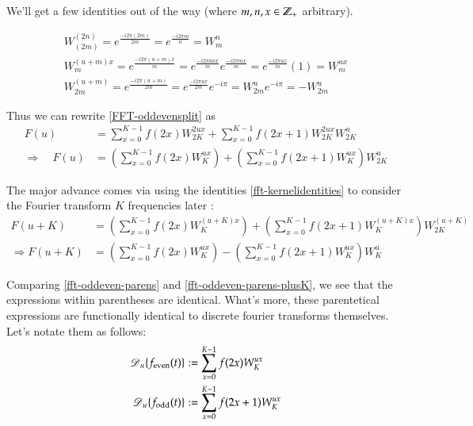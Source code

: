 We'll get a few identities out of the way (where $m, n, x \in \mathbb{Z}_{+}$ arbitrary).

\begin{gather} \label{fft-kernelidentities}
W_{(2m)}^{(2n)} = e^{\frac{-i2\pi(2m)}{2m}} = e^{\frac{-i2\pi m}{n}} = W_{m}^{n} \\
W_{m}^{(u+m)x} = e^{\frac{-i2\pi(u+m)x}{m} } = e^{\frac{-i2\pi unx}{m}} e^{\frac{-i2\pi mx}{m}}
			= e^{\frac{-i2\pi ux }{m}} (1) = W_m^{ux} \\
W_{2m}^{(u+m)} = e^{\frac{-i2\pi(u+m)}{2m}} = e^{\frac{-i2\pi ux}{2m}} e^{-i\pi}
	 = W_{2m}^{u} e^{-i\pi} = - W_{2m}^{u}
\end{gather}

Thus we can rewrite \cref{FFT-oddevensplit} as
\begin{align}
F(u)  &= \sum_{x=0}^{K-1} f(2x) W_{2K}^{2ux} + \sum_{x=0}^{K-1} f(2x+1) W_{2K}^{2ux} W_{2K}^{u} \\
\Longrightarrow \quad F(u) &= \left(\sum_{x=0}^{K-1} f(2x) W_{K}^{ux}\right)
+ \left(\sum_{x=0}^{K-1} f(2x+1) W_{K}^{ux}\right) W_{2K}^{u}
\label{fft-oddeven-parens}
\end{align} 

The major advance comes via using the identities \cref{fft-kernelidentities}  to consider the Fourier transform $K$ 
frequencies later :
\begin{align}
F(u+K) &= \left(\sum_{x=0}^{K-1} f(2x) W_{K}^{(u+K)x}\right)
+ \left(\sum_{x=0}^{K-1} f(2x+1) W_{K}^{(u+K)x}\right) W_{2K}^{(u+K)}\\
\Longrightarrow F(u+K) &= \left(\sum_{x=0}^{K-1} f(2x) W_{K}^{ux}\right)-\left(\sum_{x=0}^{K-1} f(2x+1)W_K^{ux}\right) W_K^{u}
\label{fft-oddeven-parens-plusK}
\end{align}


Comparing \cref{fft-oddeven-parens} and \cref{fft-oddeven-parens-plusK}, we see that the expressions within parentheses are identical.
What's more, these parentetical expressions are functionally identical to discrete fourier transforms themselves. Let's notate them as follows:
\begin{align} \label{fft-oddeven-subdfts}
\operatorname{\mathscr{D}}_u\{f_{\mathrm{even}}(t)\} &:= \sum_{x=0}^{K-1} f(2x)W_K^{ux} \\
\operatorname{\mathscr{D}}_u\{f_{\mathrm{odd}}(t)\} &:= \sum_{x=0}^{K-1} f(2x+1)W_K^{ux}
\end{align}

